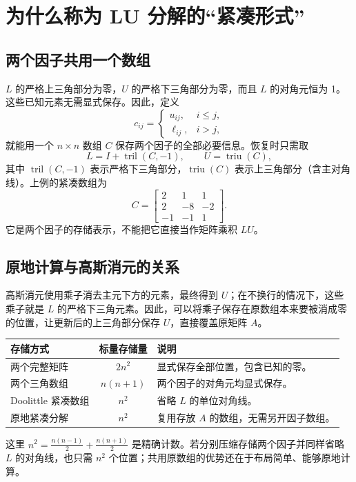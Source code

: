 \documentclass[UTF8,11pt,a4paper,fontset=fandol]{ctexart}
\newcommand{\mat}[1]{\begin{bmatrix}#1\end{bmatrix}}
\begin{document}
\section{为什么称为 LU 分解的“紧凑形式”}
\subsection{两个因子共用一个数组}
$L$ 的严格上三角部分为零，$U$ 的严格下三角部分为零，而且 $L$ 的对角元恒为 1。这些已知元素无需显式保存。因此，定义
\begin{equation}
c_{ij}=\begin{cases}u_{ij},&i\le j,\\\ell_{ij},&i>j,\end{cases}
\label{eq:compact}
\end{equation}
就能用一个 $n\times n$ 数组 $C$ 保存两个因子的全部必要信息。恢复时只需取
\[
L=I+\operatorname{tril}(C,-1),\qquad U=\operatorname{triu}(C),
\]
其中 $\operatorname{tril}(C,-1)$ 表示严格下三角部分，$\operatorname{triu}(C)$ 表示上三角部分（含主对角线）。上例的紧凑数组为
\[
C=\mat{2&1&1\\2&-8&-2\\-1&-1&1}.
\]
它是两个因子的存储表示，不能把它直接当作矩阵乘积 $LU$。

\subsection{原地计算与高斯消元的关系}
高斯消元使用乘子消去主元下方的元素，最终得到 $U$；在不换行的情况下，这些乘子就是 $L$ 的严格下三角元素。因此，可以将乘子保存在原数组本来要被消成零的位置，让更新后的上三角部分保存 $U$，直接覆盖原矩阵 $A$。

\begin{center}
\begin{tabularx}{\textwidth}{@{}p{}cX@{}}
\toprule
存储方式&标量存储量&说明\\
\midrule
两个完整矩阵&$2n^2$&显式保存全部位置，包含已知的零。\\
两个三角数组&$n(n+1)$&两个因子的对角元均显式保存。\\
Doolittle 紧凑数组&$n^2$&省略 $L$ 的单位对角线。\\
原地紧凑分解&$n^2$&复用存放 $A$ 的数组，无需另开因子数组。\\
\bottomrule
\end{tabularx}
\end{center}
这里 $n^2=\frac{n(n-1)}2+\frac{n(n+1)}2$ 是精确计数。若分别压缩存储两个因子并同样省略 $L$ 的对角线，也只需 $n^2$ 个位置；共用原数组的优势还在于布局简单、能够原地计算。
\end{document}
